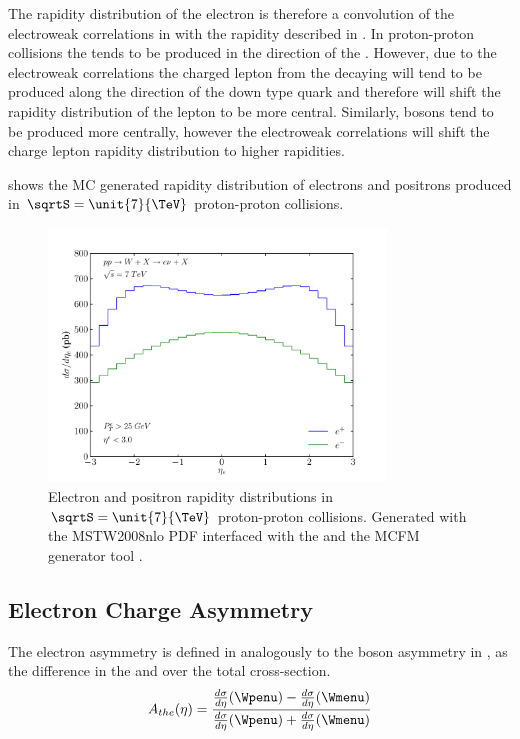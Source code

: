 The rapidity distribution of the electron is therefore a convolution of the
{electroweak} correlations in  with the \PW rapidity
described in .  In proton-proton collisions the \PWp
tends to be produced in the direction of the \Pup.  However, due to the
electroweak correlations the charged lepton from the decaying \PWp will tend to
be produced along the direction of the down type quark and therefore will shift
the rapidity distribution of the lepton to be more central. Similarly, \PWm
bosons tend to be produced more centrally, however the electroweak correlations
will shift the charge lepton rapidity distribution to higher rapidities.

 shows the {MC} generated rapidity distribution
of electrons and positrons produced in $\sqrtS=\unit{7}{\TeV}$ proton-proton collisions. 

\begin{figure}[htbp]
  \centering
  \includegraphics[width=0.8\textwidth]{lepton-rapidity}
  \caption{Electron and positron rapidity distributions in $\sqrtS=\unit{7}{\TeV}$ proton-proton collisions. 
Generated with the MSTW2008nlo PDF\cite{martin2009parton} interfaced with the
and the MCFM generator tool \cite{campbellmcfm}.}
  \label{fig:leptonrapidity}
\end{figure}

\subsection{Electron Charge Asymmetry}

The electron asymmetry is defined in  analogously to the
\PW boson asymmetry in , as the difference in the
\HepProcess{\PWplus \to \APelectron} and \HepProcess{\PWminus \to \Pelectron}
over the total \inclusiveWe cross-section.
\begin{equation}
A_{the}(\eta)=\frac{  \frac{d\sigma}{d\eta}(\Wpenu) -
\frac{d\sigma}{d\eta}(\Wmenu) }{ \frac{d\sigma}{d\eta}(\Wpenu) +
\frac{d\sigma}{d\eta}(\Wmenu) }
\label{eq:AsymThe}
\end{equation} 

